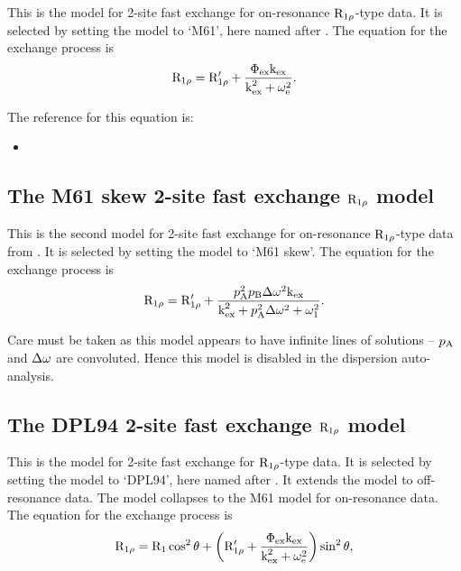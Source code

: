 This is the model for 2-site fast exchange for on-resonance $\mathrm{R}_{1\rho}$-type data.
It is selected by setting the model to `M61', here named after \citet{Meiboom61}.
The equation for the exchange process is
\begin{equation}
    \mathrm{R}_{1\rho} = \mathrm{R}_{1\rho}' + \frac{\Phi_\textrm{ex}\textrm{k}_\textrm{ex}}{\textrm{k}_\textrm{ex}^2 + \omega_\textrm{e}^2}.
\end{equation}

The reference for this equation is:
\begin{itemize}
\item {}
\end{itemize}



\subsection{The M61 skew 2-site fast exchange $\mathrm{R}_{1\rho}$ model}
\label{sect: dispersion: M61 skew model}

This is the second model for 2-site fast exchange for on-resonance $\mathrm{R}_{1\rho}$-type data from \citet{Meiboom61}.
It is selected by setting the model to `M61 skew'.
The equation for the exchange process is
\begin{equation}
    \mathrm{R}_{1\rho} = \mathrm{R}_{1\rho}' + \frac{p_\textrm{A}^2p_\textrm{B}\Delta\omega^2\textrm{k}_\textrm{ex}}{\textrm{k}_\textrm{ex}^2 + p_\textrm{A}^2\Delta\omega^2 + \omega_1^2}.
\end{equation}

Care must be taken as this model appears to have infinite lines of solutions -- $p_\textrm{A}$ and $\Delta\omega$ are convoluted.
Hence this model is disabled in the dispersion auto-analysis.



\subsection{The DPL94 2-site fast exchange $\mathrm{R}_{1\rho}$ model}
\label{sect: dispersion: DPL94 model}

This is the model for 2-site fast exchange for $\mathrm{R}_{1\rho}$-type data.
It is selected by setting the model to `DPL94', here named after \citet{Davis94}.
It extends the \citet{Meiboom61} model to off-resonance data.
The model collapses to the M61 model for on-resonance data.
The equation for the exchange process is
\begin{equation}
    \mathrm{R}_{1\rho} = \mathrm{R}_1 \cos^2\theta  +  \left( \mathrm{R}_{1\rho}' + \frac{\Phi_\textrm{ex}\textrm{k}_\textrm{ex}}{\textrm{k}_\textrm{ex}^2 + \omega_\textrm{e}^2} \right) \sin^2\theta,
\end{equation}

